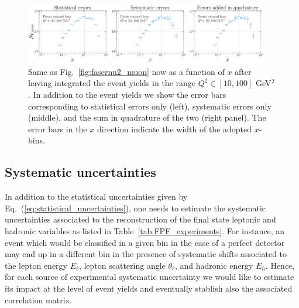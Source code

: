 \begin{figure}[h]
    \centering
    \includegraphics[width = 0.95\textwidth]{plots/error_plot_FASERv2_14.pdf}
    \caption{Same as Fig.~\ref{fig:fasernu2_muon}
      now as a function of $x$ after having integrated the event yields in the range $Q^2 \in [10,100]$ GeV$^2$.
      In addition to the event yields we show the error bars corresponding to
      statistical errors only (left), systematic errors only (middle), and the
      sum in quadrature of the two (right panel).
      The error bars in the $x$ direction indicate the width of the adopted $x$-bins.
      }
    \label{fig:error_plot_FASERv2_14}
\end{figure}

\subsection{Systematic uncertainties}

In addition to the statistical uncertainties given by Eq.~(\ref{eq:statistical_uncertainties}),
one needs to estimate the systematic uncertainties associated to the reconstruction
of the final state leptonic and hadronic variables as listed in Table~\ref{tab:FPF_experiments}.
%
For instance, an event which would be classified in a given bin in the case
of a perfect detector may end up in a different bin in the presence of systematic
shifts associated to the lepton energy $E_\ell$, lepton scattering angle $\theta_\ell$, and
hadronic energy $E_h$.
%
Hence, for each source of experimental systematic uncertainty we would like to estimate
its impact at the level of event yields and eventually stablish also the associated
correlation matrix.

